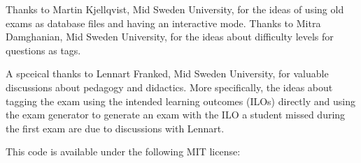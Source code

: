 Thanks to Martin Kjellqvist, Mid Sweden University, for the ideas of using old 
exams as database files and having an interactive mode.
Thanks to Mitra Damghanian, Mid Sweden University, for the ideas about 
difficulty levels for questions as tags.

A spceical thanks to Lennart Franked, Mid Sweden University, for valuable 
discussions about pedagogy and didactics.
More specifically, the ideas about tagging the exam using the intended learning 
outcomes (ILOs) directly and using the exam generator to generate an exam with 
the ILO a student missed during the first exam are due to discussions with 
Lennart.

This code is available under the following MIT license:
\begin{quote}
  
\end{quote}

